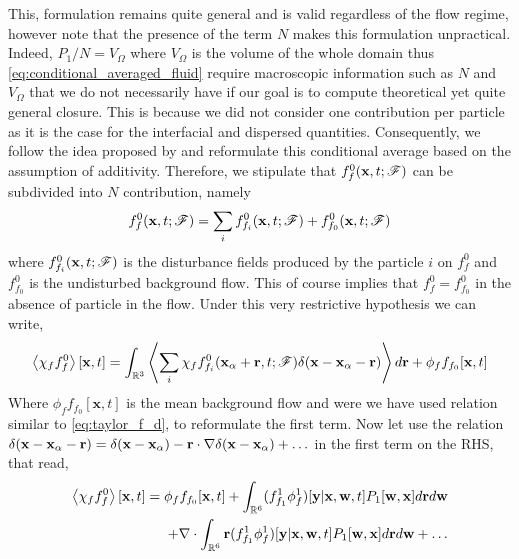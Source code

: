 This, formulation remains quite general and is valid regardless of the flow regime, however note that the presence of the term $N$ makes this formulation unpractical. 
Indeed, $P_1 /N = V_\Omega$ where $V_\Omega$ is the volume of the whole domain thus \ref{eq:conditional_averaged_fluid} require macroscopic information such as $N$ and $V_\Omega$ that we do not necessarily have if our goal is to compute theoretical yet quite general closure. 
This is because we did not consider one contribution per particle as it is the case for the interfacial and dispersed quantities.
Consequently, we follow the idea proposed by \citet{batchelor1972sedimentation} and reformulate this conditional average based on the assumption of additivity.
Therefore, we stipulate that $f_f^0(\textbf{x},t;\mathscr{F})$ can be subdivided into $N$ contribution, namely  
\begin{equation}
    f_f^0(\textbf{x},t;\mathscr{F})
    = 
    \sum_i
    f_{f_i}^0(\textbf{x},t;\mathscr{F})
    + f_{f_0}^0(\textbf{x},t;\mathscr{F})
\end{equation}
where $f_{f_i}^0(\textbf{x},t;\mathscr{F})$ is the disturbance fields produced by the particle $i$ on $f_f^0$ and $f_{f_0}^0$ is the undisturbed background flow. 
This of course implies that $f_{f}^0 = f_{f_0}^0$ in the absence of particle in the flow. 
Under this very restrictive hypothesis we can write, 
\begin{equation}
    \left<\chi_f f_f^0\right>[\textbf{x},t]
    = 
    \int_{\mathbb{R}^3} 
    \left<
        \sum_i
    \chi_f f_{f_i}^0(\textbf{x}_\alpha + \textbf{r},t;\mathscr{F}) \delta(\textbf{x} - \textbf{x}_\alpha - \textbf{r})\right>d\textbf{r}
    + \phi_f f_{f_0}[\textbf{x},t]
\end{equation}
Where $\phi_f f_{f_0}[\textbf{x},t]$ is the mean background flow and were we have used relation similar to \ref{eq:taylor_f_d}, to reformulate the first term. 
Now let use the relation  $\delta(\textbf{x} - \textbf{x}_\alpha - \textbf{r}) =\delta(\textbf{x} - \textbf{x}_\alpha) - \textbf{r}\cdot \mathbf{\nabla}\delta(\textbf{x} - \textbf{x}_\alpha)+ \ldots$ in the first term on the RHS, that read,
\begin{align}
    \avg{\chi_f f_f^0}[\textbf{x},t]
    = 
    \phi_f f_{f_0}[\textbf{x},t]
    + 
    \int_{\mathbb{R}^6} 
    (f_{f_1}^1\phi_f^1) [\textbf{y}|\textbf{x},\textbf{w},t] P_1[\textbf{w},\textbf{x}]
    d\textbf{r}
    d\textbf{w}\\
    + 
    \div 
    \int_{\mathbb{R}^6} 
    \textbf{r}
    (f_{f_1}^1\phi_f^1) [\textbf{y}|\textbf{x},\textbf{w},t] P_1[\textbf{w},\textbf{x}]
    d\textbf{r}
    d\textbf{w}
    + \ldots
    \label{eq:f_f_1_def}
\end{align}
